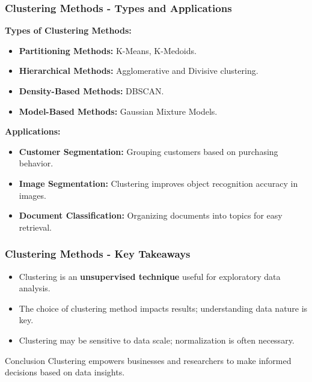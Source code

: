 \documentclass[aspectratio=169]{beamer}
\begin{document}
\begin{frame}[fragile]
    \frametitle{Clustering Methods - Types and Applications}
    \textbf{Types of Clustering Methods:}
    \begin{itemize}
        \item \textbf{Partitioning Methods:} K-Means, K-Medoids.
        \item \textbf{Hierarchical Methods:} Agglomerative and Divisive clustering.
        \item \textbf{Density-Based Methods:} DBSCAN.
        \item \textbf{Model-Based Methods:} Gaussian Mixture Models.
    \end{itemize}

    \textbf{Applications:}
    \begin{itemize}
        \item \textbf{Customer Segmentation:} Grouping customers based on purchasing behavior.
        \item \textbf{Image Segmentation:} Clustering improves object recognition accuracy in images.
        \item \textbf{Document Classification:} Organizing documents into topics for easy retrieval.
    \end{itemize}
\end{frame}

\begin{frame}[fragile]
    \frametitle{Clustering Methods - Key Takeaways}
    \begin{itemize}
        \item Clustering is an \textbf{unsupervised technique} useful for exploratory data analysis.
        \item The choice of clustering method impacts results; understanding data nature is key.
        \item Clustering may be sensitive to data scale; normalization is often necessary.
    \end{itemize}
    \begin{block}{Conclusion}
        Clustering empowers businesses and researchers to make informed decisions based on data insights.
    \end{block}
\end{frame}
\end{document}
